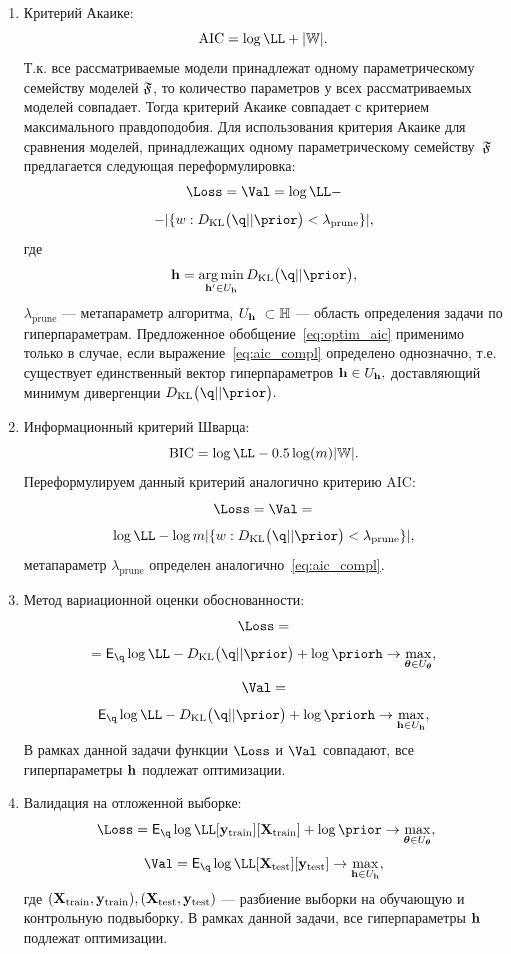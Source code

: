 \begin{enumerate}
\item Критерий Акаике:
\[
   \text{AIC} =  \log \LL + |\Wb|.
\]
Т.к. все рассматриваемые модели принадлежат одному параметрическому семейству моделей $\mathfrak{F}$, то количество параметров у всех рассматриваемых моделей  совпадает. Тогда критерий Акаике совпадает с критерием максимального правдоподобия. Для использования критерия Акаике для сравнения моделей, принадлежащих одному параметрическому семейству~$\mathfrak{F}$ предлагается следующая переформулировка:
\begin{equation}
\label{eq:optim_aic}
    \Loss = \Val = \log \LL - 
\end{equation}
\[
 - |\{w: \KL{\q}{\prior}<\lambda_\text{prune}\}|,
\]
где 
\begin{equation}\label{eq:aic_compl}\h=\argmin_{\h' \in \Uh} \KL{\q}{\prior},\end{equation} $\lambda_{\text{prune}}$ --- метапараметр алгоритма, $\Uh  \subset \Hb$ --- область определения задачи по гиперпараметрам. Предложенное обобщение~\eqref{eq:optim_aic} применимо только в случае, если выражение~\eqref{eq:aic_compl} определено однозначно, т.е. существует единственный вектор гиперпараметров  $\mathbf{h} \in U_{\mathbf{h}},$ доставляющий минимум дивергенции $\KL{\q}{\prior}.$

\item Информационный критерий Шварца:
\[
    \text{BIC} = \log \LL -0.5\log(m)|\Wb|.
\]
Переформулируем данный критерий аналогично критерию AIC:
\begin{equation}
\label{eq:optim_bic}
    \Loss = \Val =  
\end{equation}
\[
\log \LL - \log m |\{w: \KL{\q}{\prior}<\lambda_{\text{prune}}\}|,
\]
метапараметр $\lambda_{\text{prune}}$ определен аналогично~\eqref{eq:aic_compl}.

\item Метод вариационной оценки обоснованности:
\begin{equation}
\label{eq:optim_elbo_method}   
    \Loss = 
\end{equation}
\[
= \E_{\q} \log \LL - \KL{\q}{\prior} + \log\priorh \to \max_{\teta \in \Uteta},
\]
\[
     \Val = 
\]
\[
\E_{\q} \log \LL - \KL{\q}{\prior} + \log\priorh \to \max_{\h \in \Uh},
\]
В рамках данной задачи функции $\Loss$ и $\Val$ совпадают, все гиперпараметры $\mathbf{h}$ подлежат оптимизации.

\item Валидация на отложенной выборке:
\begin{equation}
\label{eq:optim_hold_out}
    \Loss = \E_{\q} \log \LL[\y_\text{train}][\X_\text{train}] + \log \prior \to \max_{\teta \in \Uteta},
\end{equation}
\[
    \Val = \E_{\q} \log \LL[\X_\text{test}][\y_\text{test}] \to \max_{\h \in \Uh},
\]
где $(\mathbf{X}_\text{train}, \mathbf{y}_\text{train}), (\mathbf{X}_\text{test}, \mathbf{y}_\text{test})$ --- разбиение выборки на обучающую и контрольную подвыборку.
В рамках данной задачи, все гиперпараметры $\mathbf{h}$ подлежат оптимизации.

\end{enumerate}

